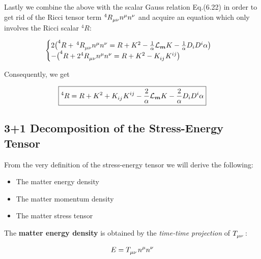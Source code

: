 \documentclass[12pt]{article}
\renewcommand{\vec}[1]{\bm{#1}}
\numberwithin{equation}{section}
\numberwithin{theorem}{subsection}
\begin{document}
Lastly we combine the above with the scalar Gauss relation Eq.(6.22) in order to get rid of the Ricci tensor term $^{4}\tensor{R}{_\mu_\nu}n^{\mu}n^{\nu}$ and acquire an equation which only involves the Ricci scalar $^{4}R$:

\begin{equation*}

\begin{cases}

2 \big(^{4}R +\,^{4}\tensor{R}{_\mu_\nu}n^{\mu}n^{\nu} = R + K^{2} - \frac{1}{\alpha}\mathcal{L}_{\vec{m}}K -\frac{1}{\alpha}D_{i}D^{i}\alpha \big) \\

- \big(^{4}R + 2 ^{4}\tensor{R}{_\mu_\nu}n^\mu n^\nu = R + K^{2} - \tensor{K}{_i_j}\tensor{K}{^i^j} \big)

\end{cases}

\end{equation*}

Consequently, we get

\begin{equation}

   \boxed{^{4}R = R + K^{2} + \tensor{K}{_i_j}\tensor{K}{^i^j} - \frac{2}{\alpha}\mathcal{L}_{\vec{m}}K-\frac{2}{\alpha}D_{i}D^{i}\alpha}

\end{equation}

\subsection{3+1 Decomposition of the Stress-Energy Tensor}

From the very definition of the stress-energy tensor we will derive the following: \begin{itemize}

    \item The matter energy density

    \item The matter momentum density

    \item The matter stress tensor

\end{itemize} The \textbf{matter energy density} is obtained by the \textit{time-time projection} of $\tensor{T}{_\mu_\nu}$:

\begin{align}

   E = \tensor{T}{_\mu_\nu}n^{\mu}n^{\nu} 

\end{align}
\end{document}
